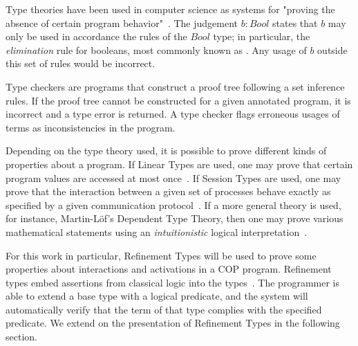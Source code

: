 Type theories have been used in computer science as systems for "proving the absence of certain 
program behavior"~\cite{pierce02}. The judgement $b : Bool$ states that $b$ may only be used in 
accordance the rules of the $Bool$ type; in particular, the \emph{elimination} rule for booleans, most 
commonly known as . Any usage of $b$ outside this set of rules would be incorrect.

Type checkers are programs that construct a proof tree following a set inference rules. If 
the proof tree cannot be constructed for a given annotated program, it is incorrect and a type error 
is returned.  A type checker flags erroneous usages of terms as inconsistencies in the program. 

Depending on the type theory used, it is possible to prove different kinds of properties about a program.
If Linear Types are used, one may prove that certain program values are accessed at most 
once~\cite{wadler93}. If Session Types are used, one may prove that the interaction between a given 
set of processes behave exactly as specified by a given communication protocol~\cite{yoshida20}.
If a more general theory is used, for instance, Martin-Löf's Dependent Type Theory, then one may 
prove various mathematical statements using an \emph{intuitionistic} logical 
interpretation~\cite{rijke22}.

For this work in particular, Refinement Types will be used to prove some properties about interactions 
and activations in a \ac{COP} program. Refinement types embed assertions from classical 
logic into the types~\cite{jhala21}. The programmer is able to extend a base type with a logical 
predicate, and the system will automatically verify that the term of that type complies with the specified 
predicate. We extend on the presentation of Refinement Types in the following section.


\endinput
